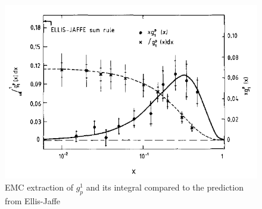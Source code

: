 \begin{figure}
  \includegraphics[width=1.0\textwidth]{figures/emc-g1p}
  \caption{EMC extraction of $g^1_p$ and its integral compared to the prediction from Ellis-Jaffe \cite{Ashman:1987hv}}
  \label{fig:emc-g1p}
\end{figure}
